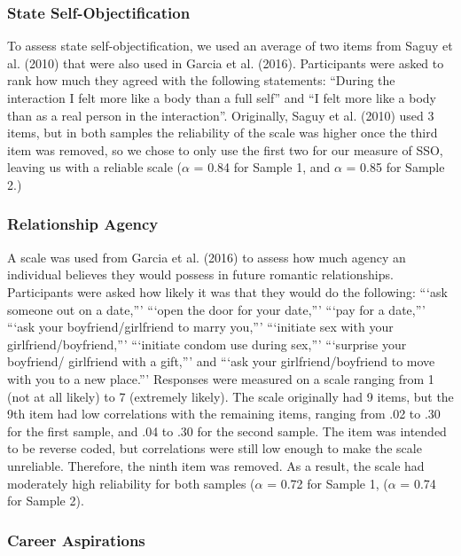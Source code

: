 \documentclass[man]{apa6}
\begin{document}
\subsubsection{State
Self-Objectification}\label{state-self-objectification}

To assess state self-objectification, we used an average of two items
from Saguy et al. (2010) that were also used in Garcia et al. (2016).
Participants were asked to rank how much they agreed with the following
statements: \enquote{During the interaction I felt more like a body than
a full self} and \enquote{I felt more like a body than as a real person
in the interaction}. Originally, Saguy et al. (2010) used 3 items, but
in both samples the reliability of the scale was higher once the third
item was removed, so we chose to only use the first two for our measure
of SSO, leaving us with a reliable scale (\(\alpha\) = 0.84 for Sample
1, and \(\alpha\) = 0.85 for Sample 2.)

\subsubsection{Relationship Agency}\label{relationship-agency}

A scale was used from Garcia et al. (2016) to assess how much agency an
individual believes they would possess in future romantic relationships.
Participants were asked how likely it was that they would do the
following: \enquote{`ask someone out on a date,}' \enquote{`open the
door for your date,}' \enquote{`pay for a date,}' \enquote{`ask your
boyfriend/girlfriend to marry you,}' \enquote{`initiate sex with your
girlfriend/boyfriend,}' \enquote{`initiate condom use during sex,}'
\enquote{`surprise your boyfriend/ girlfriend with a gift,}' and
\enquote{`ask your girlfriend/boyfriend to move with you to a new
place.}' Responses were measured on a scale ranging from 1 (not at all
likely) to 7 (extremely likely). The scale originally had 9 items, but
the 9th item had low correlations with the remaining items, ranging from
.02 to .30 for the first sample, and .04 to .30 for the second sample.
The item was intended to be reverse coded, but correlations were still
low enough to make the scale unreliable. Therefore, the ninth item was
removed. As a result, the scale had moderately high reliability for both
samples (\(\alpha\) = 0.72 for Sample 1, (\(\alpha\) = 0.74 for Sample
2).

\subsubsection{Career Aspirations}\label{career-aspirations}
\end{document}
